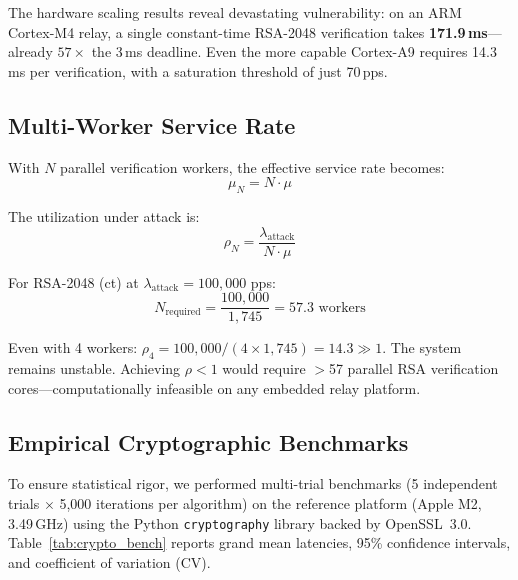 \documentclass[journal]{IEEEtran}
\begin{document}
The hardware scaling results reveal devastating vulnerability: on an ARM Cortex-M4 relay, a single constant-time RSA-2048 verification takes \textbf{171.9\,ms}---already $57\times$ the 3\,ms deadline. Even the more capable Cortex-A9 requires 14.3\,ms per verification, with a saturation threshold of just 70\,pps.

\subsection{Multi-Worker Service Rate}
With $N$ parallel verification workers, the effective service rate becomes:
\begin{equation}
\mu_N = N \cdot \mu
\end{equation}

The utilization under attack is:
\begin{equation}
\rho_N = \frac{\lambda_{\text{attack}}}{N \cdot \mu}
\end{equation}

For RSA-2048 (ct) at $\lambda_{\text{attack}} = 100{,}000$ pps:
\begin{equation}
N_{\text{required}} = \frac{100{,}000}{1{,}745} = 57.3 \text{ workers}
\end{equation}

Even with 4 workers: $\rho_4 = 100{,}000/(4 \times 1{,}745) = 14.3 \gg 1$. The system remains unstable. Achieving $\rho < 1$ would require $>$57 parallel RSA verification cores---computationally infeasible on any embedded relay platform.

\subsection{Empirical Cryptographic Benchmarks}
To ensure statistical rigor, we performed multi-trial benchmarks (5 independent trials $\times$ 5,000 iterations per algorithm) on the reference platform (Apple M2, 3.49\,GHz) using the Python \texttt{cryptography} library backed by OpenSSL~3.0. Table~\ref{tab:crypto_bench} reports grand mean latencies, 95\% confidence intervals, and coefficient of variation (CV).
\end{document}
